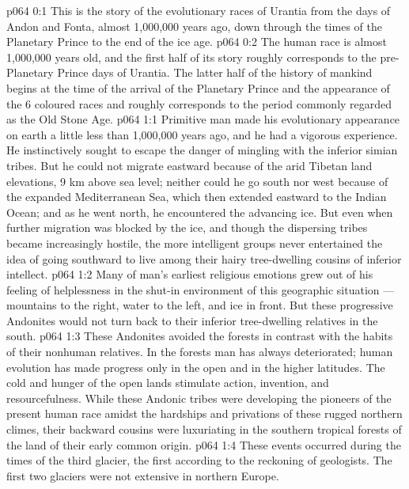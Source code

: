 \author{Life Carrier}
\vs p064 0:1 This is the story of the evolutionary races of Urantia from the days of Andon and Fonta, almost 1,000,000 years ago, down through the times of the Planetary Prince to the end of the ice age.
\vs p064 0:2 The human race is almost 1,000,000 years old, and the first half of its story roughly corresponds to the pre\hyp{}Planetary Prince days of Urantia. The latter half of the history of mankind begins at the time of the arrival of the Planetary Prince and the appearance of the 6 coloured races and roughly corresponds to the period commonly regarded as the Old Stone Age.
\vs p064 1:1 Primitive man made his evolutionary appearance on earth a little less than 1,000,000 years ago, and he had a vigorous experience. He instinctively sought to escape the danger of mingling with the inferior simian tribes. But he could not migrate eastward because of the arid Tibetan land elevations, 9 km above sea level; neither could he go south nor west because of the expanded Mediterranean Sea, which then extended eastward to the Indian Ocean; and as he went north, he encountered the advancing ice. But even when further migration was blocked by the ice, and though the dispersing tribes became increasingly hostile, the more intelligent groups never entertained the idea of going southward to live among their hairy tree\hyp{}dwelling cousins of inferior intellect.
\vs p064 1:2 Many of man’s earliest religious emotions grew out of his feeling of helplessness in the shut\hyp{}in environment of this geographic situation --- mountains to the right, water to the left, and ice in front. But these progressive Andonites would not turn back to their inferior tree\hyp{}dwelling relatives in the south.
\vs p064 1:3 These Andonites avoided the forests in contrast with the habits of their nonhuman relatives. In the forests man has always deteriorated; human evolution has made progress only in the open and in the higher latitudes. The cold and hunger of the open lands stimulate action, invention, and resourcefulness. While these Andonic tribes were developing the pioneers of the present human race amidst the hardships and privations of these rugged northern climes, their backward cousins were luxuriating in the southern tropical forests of the land of their early common origin.
\vs p064 1:4 \pc These events occurred during the times of the third glacier, the first according to the reckoning of geologists. The first two glaciers were not extensive in northern Europe.
